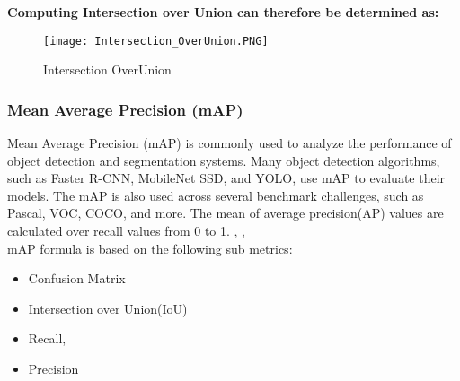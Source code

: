 \textbf{Computing Intersection over Union can therefore be determined as:}\\

\begin{figure}[H]
    \centering
    \texttt{[image: Intersection\_OverUnion.PNG]}
    \caption{Intersection OverUnion}
    \label{fig:Intersection_OverUnion}
\end{figure}

\subsubsection{Mean Average Precision (mAP)}

Mean Average Precision (mAP) is commonly used to analyze the performance of object detection and segmentation systems. Many object detection algorithms, such as Faster R-CNN, MobileNet SSD, and YOLO, use mAP to evaluate their models. The mAP is also used across several benchmark challenges, such as Pascal, VOC, COCO, and more. The mean of average precision(AP) values are calculated over recall values from 0 to 1. \cite{padilla2020survey}, \cite{ansari2020building},  \\
mAP formula is based on the following sub metrics:
\begin{itemize}
    \item Confusion Matrix
    \item Intersection over Union(IoU)
    \item Recall,
    \item Precision
\end{itemize}
